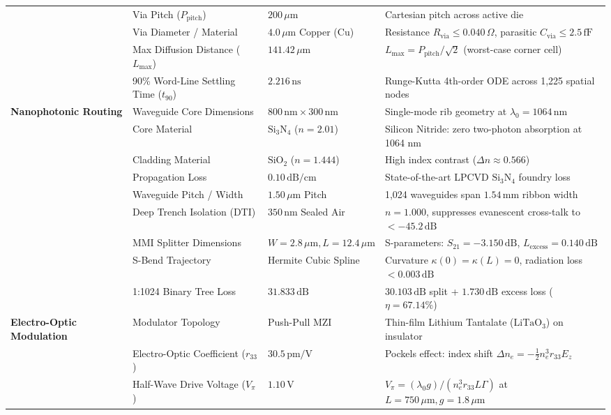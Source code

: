 \documentclass[journal]{IEEEtran}
\begin{document}
\begin{table}[!t]
{\begin{tabular}{llll}
& Via Pitch ($P_{\text{pitch}}$) & $200\,\mu\text{m}$ & Cartesian pitch across active die \\
& Via Diameter / Material & $4.0\,\mu\text{m}$ Copper (Cu) & Resistance $R_{\text{via}} \le 0.040\,\Omega$, parasitic $C_{\text{via}} \le 2.5\,\text{fF}$ \\
& Max Diffusion Distance ($L_{\max}$) & $141.42\,\mu\text{m}$ & $L_{\max} = P_{\text{pitch}} / \sqrt{2}$ (worst-case corner cell) \\
& 90\% Word-Line Settling Time ($t_{90}$) & $2.216\,\text{ns}$ & Runge-Kutta 4th-order ODE across 1,225 spatial nodes \\
\midrule
\textbf{Nanophotonic Routing} & Waveguide Core Dimensions & $800\,\text{nm} \times 300\,\text{nm}$ & Single-mode rib geometry at $\lambda_0 = 1064\,\text{nm}$ \\
& Core Material & $\text{Si}_3\text{N}_4$ ($n = 2.01$) & Silicon Nitride: zero two-photon absorption at 1064 nm \\
& Cladding Material & $\text{SiO}_2$ ($n = 1.444$) & High index contrast ($\Delta n \approx 0.566$) \\
& Propagation Loss & $0.10\,\text{dB/cm}$ & State-of-the-art LPCVD $\text{Si}_3\text{N}_4$ foundry loss \\
& Waveguide Pitch / Width & $1.50\,\mu\text{m}$ Pitch & 1,024 waveguides span $1.54\,\text{mm}$ ribbon width \\
& Deep Trench Isolation (DTI) & $350\,\text{nm}$ Sealed Air & $n = 1.000$, suppresses evanescent cross-talk to $<-45.2\,\text{dB}$ \\
& MMI Splitter Dimensions & $W = 2.8\,\mu\text{m}, L = 12.4\,\mu\text{m}$ & S-parameters: $S_{21} = -3.150\,\text{dB}$, $L_{\text{excess}} = 0.140\,\text{dB}$ \\
& S-Bend Trajectory & Hermite Cubic Spline & Curvature $\kappa(0) = \kappa(L) = 0$, radiation loss $<0.003\,\text{dB}$ \\
& 1:1024 Binary Tree Loss & $31.833\,\text{dB}$ & $30.103\,\text{dB}$ split + $1.730\,\text{dB}$ excess loss ($\eta = 67.14\%$) \\
\midrule
\textbf{Electro-Optic Modulation} & Modulator Topology & Push-Pull MZI & Thin-film Lithium Tantalate ($\text{LiTaO}_3$) on insulator \\
& Electro-Optic Coefficient ($r_{33}$) & $30.5\,\text{pm/V}$ & Pockels effect: index shift $\Delta n_e = -\frac{1}{2} n_e^3 r_{33} E_z$ \\
& Half-Wave Drive Voltage ($V_\pi$) & $1.10\,\text{V}$ & $V_\pi = (\lambda_0 g) / (n_e^3 r_{33} L \Gamma)$ at $L = 750\,\mu\text{m}, g = 1.8\,\mu\text{m}$ \\

\end{tabular}}
\end{table}
\end{document}
